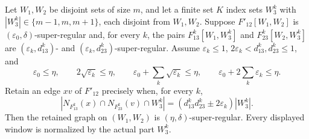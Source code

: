 \begin{lemma}
Let $W_1,W_2$ be disjoint sets of size $m$, and let a finite set $K$ index
sets $W_3^k$ with $|W_3^k|\in\{m-1,m,m+1\}$, each disjoint from $W_1,W_2$.
Suppose $F'_{12}[W_1,W_2]$ is $(\varepsilon_0,\delta)$-super-regular and,
for every $k$, the pairs $F_{13}^k[W_1,W_3^k]$ and
$F_{23}^k[W_2,W_3^k]$ are $(\varepsilon_k,d_{13}^k)$- and
$(\varepsilon_k,d_{23}^k)$-super-regular. Assume
$\varepsilon_k\leq1$, $2\varepsilon_k<d_{13}^k,d_{23}^k\leq1$, and
\[
 \varepsilon_0\leq\eta,\qquad2\sqrt{\varepsilon_k}\leq\eta,
 \qquad \varepsilon_0+\sum_k\sqrt{\varepsilon_k}\leq\eta,
 \qquad \varepsilon_0+2\sum_k\varepsilon_k\leq\eta.
\]
Retain an edge $xv$ of $F'_{12}$ precisely when, for every $k$,
\[
 |N_{F_{13}^k}(x)\cap N_{F_{23}^k}(v)\cap W_3^k|
 =(d_{13}^kd_{23}^k\pm2\varepsilon_k)|W_3^k|.
\]
Then the retained graph on $(W_1,W_2)$ is $(\eta,\delta)$-super-regular.
Every displayed window is normalized by the actual part $W_3^k$.
\end{lemma}
